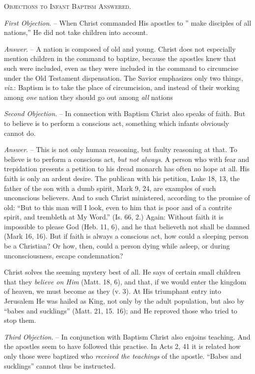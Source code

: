\documentclass[
]{book}
\begin{document}
\begin{center}
\textsc{Objections to Infant Baptism Answered.}
\end{center}

\emph{First Objection}. -- When Christ commanded His apostles to '' make disciples of all nations,'' He did not take children into account.

\emph{Answer}. -- A nation is composed of old and young. Christ does not especially mention children in the command to baptize, because the apostles knew that such were included, even as they were included in the command to circumcise under the Old Testament dispensation. The Savior emphasizes only two things, \emph{viz}.: Baptism is to take the place of circumcision, and instead of their working among \emph{one} nation they should go out among \emph{all} nations

\emph{Second Objection}. -- In connection with Baptism Christ also speaks of faith. But to believe is to perform a conscious act, something which infants obviously cannot do.

\emph{Answer}. -- This is not only human reasoning, but faulty reasoning at that. To believe is to perform a conscious act, \emph{but not always}. A person who with fear and trepidation presents a petition to his dread monarch has often no hope at all. His faith is only an ardent desire. The publican with his petition, Luke 18, 13, the father of the son with a dumb spirit, Mark 9, 24, are examples of such unconscious believers. And to such Christ ministered, according to the promise of old: ``But to this man will I look, even to him that is poor and of a contrite spirit, and trembleth at My Word.'' (Is. 66, 2.) Again: Without faith it is impossible to please God (Heb. 11, 6), and he that believeth not shall be damned (Mark 16, 16). But if faith is always a conscious act, how could a sleeping person be a Christian? Or how, then, could a person dying while asleep, or during unconsciousness, escape condemnation?

Christ solves the seeming mystery best of all. He says of certain small children that they \emph{believe on Him} (Matt. 18, 6), and that, if we would enter the kingdom of heaven, we must become as they (v. 3). At His triumphant entry into Jerusalem He was hailed as King, not only by the adult population, but also by ``babes and sucklings'' (Matt. 21, 15. 16); and He reproved those who tried to stop them.

\emph{Third Objection}. -- In conjunction with Baptism Christ also enjoins teaching. And the apostles seem to have followed this practise. In Acts 2, 41 it is related how only those were baptized who \emph{received the teachings} of the apostle. ``Babes and sucklings'' cannot thus be instructed.
\end{document}
